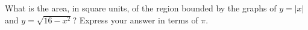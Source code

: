 What is the area, in square units, of the region bounded by the graphs of $y=|x|$ and $y=\sqrt{16-x^2}$? Express your answer in terms of $\pi$.
